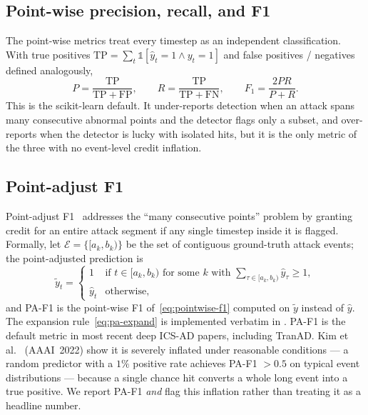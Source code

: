 \subsection{Point-wise precision, recall, and F1}
\label{sec:metric-pointwise}

The point-wise metrics treat every timestep as an independent classification.  With true positives $\mathrm{TP} = \sum_t \mathbb{1}[\hat{y}_t = 1 \wedge y_t = 1]$ and false positives / negatives defined analogously,
\begin{equation}
  P = \frac{\mathrm{TP}}{\mathrm{TP} + \mathrm{FP}}, \qquad
  R = \frac{\mathrm{TP}}{\mathrm{TP} + \mathrm{FN}}, \qquad
  F_1 = \frac{2PR}{P + R}.
  \label{eq:pointwise-f1}
\end{equation}
This is the scikit-learn default.  It under-reports detection when an attack spans many consecutive abnormal points and the detector flags only a subset, and over-reports when the detector is lucky with isolated hits, but it is the only metric of the three with no event-level credit inflation.

\subsection{Point-adjust F1}
\label{sec:metric-pa}

Point-adjust F1~\cite{xu2018unsupervised} addresses the ``many consecutive points'' problem by granting credit for an entire attack segment if any single timestep inside it is flagged.  Formally, let $\mathcal{E} = \{[a_k, b_k)\}$ be the set of contiguous ground-truth attack events; the point-adjusted prediction is
\begin{equation}
  \tilde{y}_t =
  \begin{cases}
    1 & \text{if } t \in [a_k, b_k) \text{ for some } k \text{ with } \sum_{\tau \in [a_k,b_k)} \hat{y}_\tau \geq 1,\\
    \hat{y}_t & \text{otherwise,}
  \end{cases}
  \label{eq:pa-expand}
\end{equation}
and PA-F1 is the point-wise F1 of~\eqref{eq:pointwise-f1} computed on $\tilde{y}$ instead of $\hat{y}$.  The expansion rule~\eqref{eq:pa-expand} is implemented verbatim in .  PA-F1 is the default metric in most recent deep ICS-AD papers, including TranAD.  Kim et al.~\cite{kim2022towards} (AAAI~2022) show it is severely inflated under reasonable conditions --- a random predictor with a $1\%$ positive rate achieves PA-F1 $> 0.5$ on typical event distributions --- because a single chance hit converts a whole long event into a true positive.  We report PA-F1 \emph{and} flag this inflation rather than treating it as a headline number.

